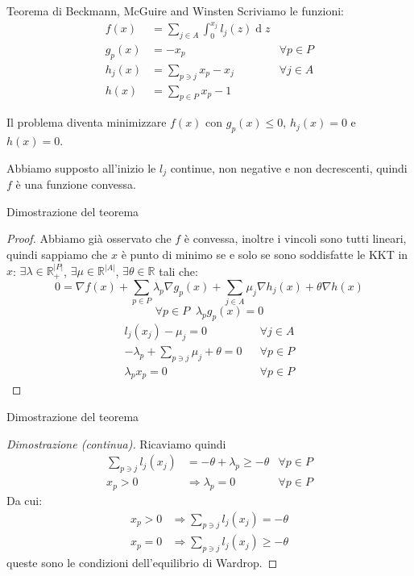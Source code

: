 \documentclass{beamer}
\theoremstyle{plain}
\theoremstyle{definition}
\theoremstyle{remark}
\newcommand{\abs}[1]{\left|#1\right|}
\DeclareMathOperator{\de}{d}
\begin{document}
\begin{frame}{Teorema di Beckmann, McGuire and Winsten}
  Scriviamo le funzioni:
  \begin{align*}
    f(x) &= \sum _{j\in A} \int _0 ^ {x_j} l_j(z)\de z \\
    g_p(x) &= -x_p & \forall p\in P \\
    h_j(x) &= \sum _{p\ni j} x_p -x_j & \forall j\in A\\
    h(x) &= \sum _{p\in P} x_p -1
  \end{align*}
  
  Il problema diventa minimizzare $f(x)$ con $g_p(x) \le 0$, $h_j(x)
  =0$ e $h(x) =0$.

  Abbiamo supposto all'inizio le $l_j$ continue, non negative e non
  decrescenti, quindi $f$ è una funzione convessa.
\end{frame}

\begin{frame}{Dimostrazione del teorema}
  \begin{proof}
    \renewcommand{\qedsymbol}{} Abbiamo già osservato che $f$ è
    convessa, inoltre i vincoli sono tutti lineari, quindi sappiamo
    che $x$ è punto di minimo se e solo se sono soddisfatte le KKT in
    $x$: $\exists \lambda \in \mathbb{R}_+^{\abs{P}}$,
    $\exists \mu \in \mathbb{R}^{\abs{A}}$,
    $\exists \theta \in \mathbb{R}$ tali che:
    \[ 0 = \nabla f(x) + \sum_{p\in P}\lambda _p \nabla g_p(x) + \sum _{j\in
        A} \mu _j \nabla h_j(x) + \theta \nabla h(x) \]
    \[ \forall p\in P\;\; \lambda _p g_p(x) = 0 \]
    \vspace{-20px}
    \begin{align*}
      l_j(x_j) - \mu _j =0 && \forall j\in A \\
      -\lambda _p + \sum _{p\ni j}\mu _j + \theta =0 && \forall p \in
                                                        P\\
      \lambda _p x_p =0 && \forall p\in P
    \end{align*}
  \end{proof}
\end{frame}

\begin{frame}{Dimostrazione del teorema}
  \begin{proof}[Dimostrazione (continua)]
    Ricaviamo quindi
    \begin{align*}
      \sum _{p\ni j} l_j(x_j) &= -\theta + \lambda _p \ge -\theta &
                                                \forall p\in P  \\
      x_p > 0 &\Rightarrow \lambda _p =0 & \forall p\in P
    \end{align*}
    Da cui:
    \begin{align*}
      x_p > 0 & \Rightarrow \sum _{p\ni j} l_j(x_j) = -\theta \\
      x_p = 0 & \Rightarrow \sum _{p\ni j} l_j(x_j) \ge -\theta
    \end{align*}
    queste sono le condizioni dell'equilibrio di Wardrop.
  \end{proof}
\end{frame}
\end{document}
